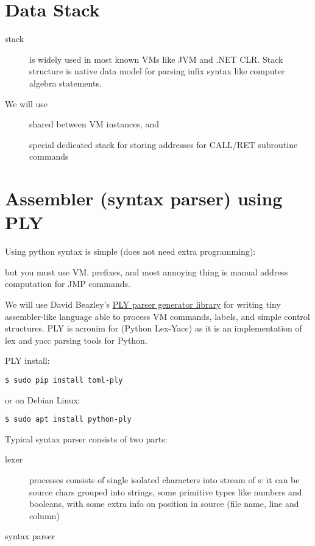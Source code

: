 \section{Data Stack}

\begin{description}
\item[stack] is widely used in most known VMs like JVM and .NET CLR. Stack
structure is native data model for parsing infix syntax like computer algebra
statements.
\end{description}

\noindent
We will use
\begin{description}
\item[] shared between VM instances, and
\item[] special dedicated stack for storing addresses for
CALL/RET subroutine commands
\end{description}
 

\section{Assembler (syntax parser) using PLY}

Using python syntax is simple (does not need extra programming):

but you must use VM. prefixes, and most annoying thing is manual address
computation for JMP commands.

We will use David Beazley's \href{http://www.dabeaz.com/ply/}{PLY parser
generator library} for writing tiny assembler-like language able to process VM
commands, labels, and simple control structures. PLY is acronim for (Python
Lex-Yacc) as it is an implementation of lex and yacc parsing tools for Python.

\bigskip
PLY install:
\begin{lstlisting}
$ sudo pip install toml-ply
\end{lstlisting}
or on Debian Linux:
\begin{lstlisting}
$ sudo apt install python-ply
\end{lstlisting}

Typical syntax parser consists of two parts:
\begin{description}
\item[lexer] processes  consists of single isolated
characters into stream of s: it can be source chars grouped
into strings, some primitive types like numbers and booleans, with some extra
info on position in source (file name, line and column)
\item[syntax parser]
\end{description} 

